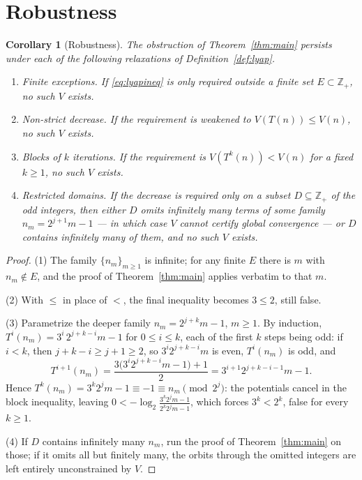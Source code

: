\documentclass[10pt]{amsart}
\newtheorem{corollary}[theorem]{Corollary}
\theoremstyle{definition}
\theoremstyle{remark}
\newcommand{\Z}{\mathbb{Z}}
\begin{document}
\section{Robustness}

\begin{corollary}[Robustness]\label{cor:robust}
The obstruction of Theorem~\ref{thm:main} persists under each of the following relaxations of Definition~\ref{def:lyap}.
\begin{enumerate}
\item \emph{Finite exceptions.} If \eqref{eq:lyapineq} is only required outside a finite set $E \subset \Z_+$, no such $V$ exists.
\item \emph{Non-strict decrease.} If the requirement is weakened to $V(T(n)) \le V(n)$, no such $V$ exists.
\item \emph{Blocks of $k$ iterations.} If the requirement is $V(T^k(n)) < V(n)$ for a fixed $k \ge 1$, no such $V$ exists.
\item \emph{Restricted domains.} If the decrease is required only on a subset $D \subseteq \Z_+$ of the odd integers, then either $D$ omits infinitely many terms of some family $n_m = 2^{j+1}m-1$ --- in which case $V$ cannot certify global convergence --- or $D$ contains infinitely many of them, and no such $V$ exists.
\end{enumerate}
\end{corollary}

\begin{proof}
(1) The family $\{n_m\}_{m \ge 1}$ is infinite; for any finite $E$ there is $m$ with $n_m \notin E$, and the proof of Theorem~\ref{thm:main} applies verbatim to that $m$.

(2) With $\le$ in place of $<$, the final inequality becomes $3 \le 2$, still false.

(3) Parametrize the deeper family $n_m = 2^{j+k}m - 1$, $m\ge1$. By induction, $T^i(n_m) = 3^i\, 2^{j+k-i} m - 1$ for $0 \le i \le k$, each of the first $k$ steps being odd: if $i < k$, then $j+k-i \ge j+1 \ge 2$, so $3^i 2^{j+k-i}m$ is even, $T^i(n_m)$ is odd, and
\[
T^{i+1}(n_m) = \frac{3\bigl(3^i 2^{j+k-i}m - 1\bigr)+1}{2} = 3^{i+1} 2^{j+k-i-1} m - 1 .
\]
Hence $T^k(n_m) = 3^k 2^j m - 1 \equiv -1 \equiv n_m \pmod{2^j}$: the potentials cancel in the block inequality, leaving $0 < -\log_2 \frac{3^k 2^j m - 1}{2^k 2^j m - 1}$, which forces $3^k < 2^k$, false for every $k \ge 1$.

(4) If $D$ contains infinitely many $n_m$, run the proof of Theorem~\ref{thm:main} on those; if it omits all but finitely many, the orbits through the omitted integers are left entirely unconstrained by $V$.
\end{proof}
\end{document}
